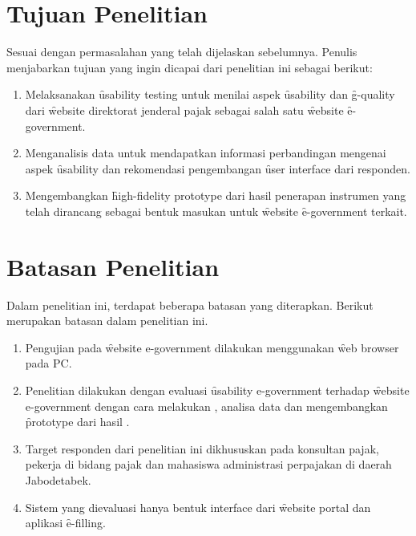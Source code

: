 \section{Tujuan Penelitian}
Sesuai dengan permasalahan yang telah dijelaskan sebelumnya. Penulis menjabarkan tujuan yang ingin dicapai dari penelitian ini sebagai berikut:
\begin{enumerate}
\item Melaksanakan \f{usability testing} untuk menilai aspek \f{usability} dan \f{g-quality} dari \f{website} direktorat jenderal pajak sebagai salah satu \f{website} \f{e-government}.
\item Menganalisis data untuk mendapatkan informasi perbandingan mengenai aspek 
\f{usability} dan rekomendasi pengembangan \f{user interface} dari responden.
\item Mengembangkan \f{high-fidelity prototype} dari hasil penerapan instrumen yang telah dirancang sebagai bentuk masukan untuk \f{website} \f{e-government} terkait.
\end{enumerate}
\section{Batasan Penelitian}
Dalam penelitian ini, terdapat beberapa batasan yang diterapkan. Berikut merupakan batasan dalam penelitian ini.
\begin{enumerate}
	\item Pengujian pada \f{website e-government} dilakukan menggunakan \f{web browser} pada PC.
	\item Penelitian dilakukan dengan evaluasi \f{usability e-government} terhadap \f{website e-government} dengan cara melakukan \ust, analisa data dan mengembangkan \f{prototype} dari hasil \ust.
	\item Target responden dari penelitian ini dikhususkan pada konsultan pajak, pekerja di bidang pajak dan mahasiswa administrasi perpajakan di daerah Jabodetabek.
	\item Sistem yang dievaluasi hanya bentuk interface dari \f{website} portal dan aplikasi \f{e-filling}.
\end{enumerate}
